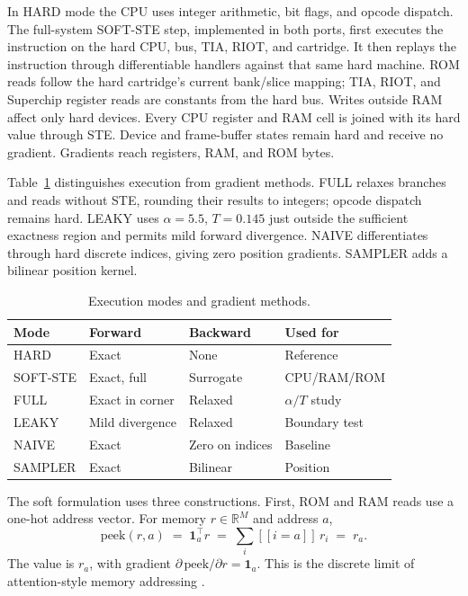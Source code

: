 \documentclass[letterpaper]{article} %
\begin{document}
In HARD mode the CPU uses integer arithmetic, bit flags, and
opcode dispatch. The full-system SOFT-STE step, implemented
in both ports, first executes the instruction on the hard
CPU, bus, TIA, RIOT, and cartridge. It then replays the
instruction through differentiable handlers against that same
hard machine. ROM reads follow the hard cartridge's current
bank/slice mapping; TIA, RIOT, and Superchip register reads
are constants from the hard bus. Writes outside RAM affect
only hard devices. Every CPU register and RAM cell is joined
with its hard value through STE. Device and frame-buffer
states remain hard and receive no gradient. Gradients reach
registers, RAM, and ROM bytes.

Table~\ref{tab:modes} distinguishes execution from gradient
methods. FULL relaxes branches and reads without STE,
rounding their results to integers; opcode dispatch remains
hard. LEAKY uses $\alpha=5.5$, $T=0.145$ just outside the
sufficient exactness region and permits mild forward divergence.
NAIVE differentiates through hard discrete indices, giving zero
position gradients. SAMPLER adds a bilinear position kernel.

\begin{table}[t]
\centering
\setlength{\tabcolsep}{3pt}
\small
\caption{Execution modes and gradient methods.}
\label{tab:modes}
\begin{tabular}{llll}
\toprule
Mode & Forward & Backward & Used for \\
\midrule
HARD & Exact & None & Reference \\
SOFT-STE & Exact, full & Surrogate & CPU/RAM/ROM \\
FULL & Exact in corner & Relaxed & $\alpha/T$ study \\
LEAKY & Mild divergence & Relaxed & Boundary test \\
NAIVE & Exact & Zero on indices & Baseline \\
SAMPLER & Exact & Bilinear & Position \\
\bottomrule
\end{tabular}
\end{table}

The soft formulation uses three constructions. First, ROM
and RAM reads use a one-hot address vector. For memory
$r\in\mathbb{R}^{M}$ and address $a$,
\begin{equation}
\mathrm{peek}(r,a) \;=\; \mathbf{1}_a^{\top} r \;=\; \sum_{i} [\![i=a]\!]\, r_i \;=\; r_a .
\label{eq:peek}
\end{equation}
The value is $r_a$, with gradient
$\partial\,\mathrm{peek}/\partial r=\mathbf{1}_a$.
This is the discrete limit of attention-style memory addressing
\citep{graves2014ntm}.
\end{document}
